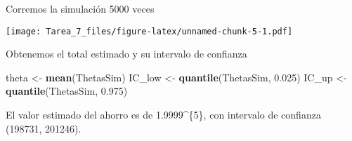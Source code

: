 \documentclass[]{article}
\newenvironment{Shaded}{\begin{snugshade}}{\end{snugshade}}
\newcommand{\KeywordTok}[1]{\textcolor[rgb]{0.13,0.29,0.53}{\textbf{#1}}}
\newcommand{\DataTypeTok}[1]{\textcolor[rgb]{0.13,0.29,0.53}{#1}}
\newcommand{\DecValTok}[1]{\textcolor[rgb]{0.00,0.00,0.81}{#1}}
\newcommand{\FloatTok}[1]{\textcolor[rgb]{0.00,0.00,0.81}{#1}}
\newcommand{\StringTok}[1]{\textcolor[rgb]{0.31,0.60,0.02}{#1}}
\newcommand{\OperatorTok}[1]{\textcolor[rgb]{0.81,0.36,0.00}{\textbf{#1}}}
\newcommand{\NormalTok}[1]{#1}
\begin{document}
Corremos la simulación 5000 veces

\begin{Shaded}
\end{Shaded}

\texttt{[image: Tarea\_7\_files/figure-latex/unnamed-chunk-5-1.pdf]}

Obtenemos el total estimado y su intervalo de confianza

\begin{Shaded}
\begin{Highlighting}[]
\NormalTok{theta  <-}\StringTok{ }\KeywordTok{mean}\NormalTok{(ThetasSim)}
\NormalTok{IC_low <-}\StringTok{ }\KeywordTok{quantile}\NormalTok{(ThetasSim, }\FloatTok{0.025}\NormalTok{)}
\NormalTok{IC_up  <-}\StringTok{ }\KeywordTok{quantile}\NormalTok{(ThetasSim, }\FloatTok{0.975}\NormalTok{)}
\end{Highlighting}
\end{Shaded}

El valor estimado del ahorro es de 1.9999\^{}\{5\}, con
intervalo de confianza (198731, 201246).
\end{document}
